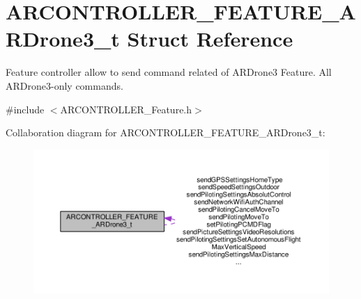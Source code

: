 \hypertarget{struct_a_r_c_o_n_t_r_o_l_l_e_r___f_e_a_t_u_r_e___a_r_drone3__t}{}\section{A\+R\+C\+O\+N\+T\+R\+O\+L\+L\+E\+R\+\_\+\+F\+E\+A\+T\+U\+R\+E\+\_\+\+A\+R\+Drone3\+\_\+t Struct Reference}
\label{struct_a_r_c_o_n_t_r_o_l_l_e_r___f_e_a_t_u_r_e___a_r_drone3__t}


Feature controller allow to send command related of A\+R\+Drone3 Feature. All A\+R\+Drone3-\/only commands.  




{\ttfamily \#include $<$A\+R\+C\+O\+N\+T\+R\+O\+L\+L\+E\+R\+\_\+\+Feature.\+h$>$}



Collaboration diagram for A\+R\+C\+O\+N\+T\+R\+O\+L\+L\+E\+R\+\_\+\+F\+E\+A\+T\+U\+R\+E\+\_\+\+A\+R\+Drone3\+\_\+t\+:
\nopagebreak
\begin{figure}[H]
\begin{center}
\leavevmode
\includegraphics[width=350pt]{struct_a_r_c_o_n_t_r_o_l_l_e_r___f_e_a_t_u_r_e___a_r_drone3__t__coll__graph}
\end{center}
\end{figure}
